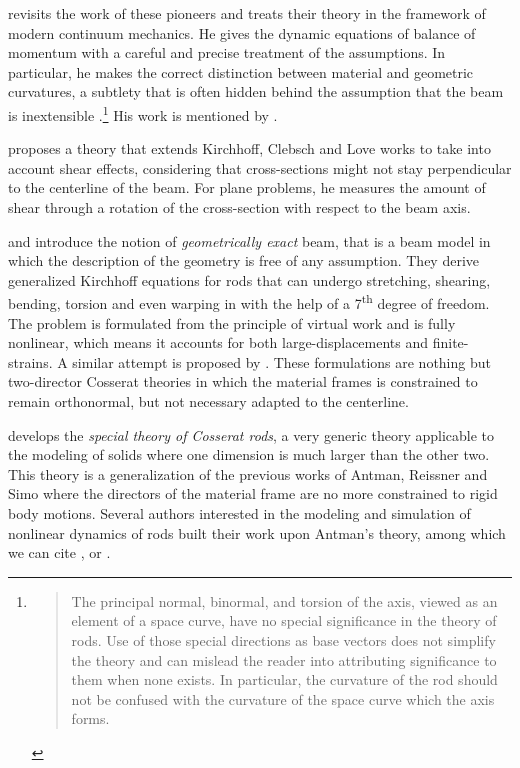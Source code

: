  revisits the work of these pioneers and treats their theory in the framework of modern continuum mechanics. He gives the dynamic equations of balance of momentum with a careful and precise treatment of the assumptions. In particular, he makes the correct distinction between material and geometric curvatures, a subtlety that is often hidden behind the assumption that the beam is inextensible \cite{Adriaenssens1999,Douthe2007,DAmico2014}.\footnote{\blockcquote[p.~5]{Dill1992}{The principal normal, binormal, and torsion of the axis, viewed as an element of a space curve, have no special significance in the theory of rods. Use of those special directions as base vectors does not simplify the theory and can mislead the reader into attributing significance to them when none exists. In particular, the curvature of the rod should not be confused with the curvature of the space curve which the axis forms.}} His work is mentioned by .


 proposes a theory that extends Kirchhoff, Clebsch and Love works to take into account shear effects, considering that cross-sections might not stay perpendicular to the centerline of the beam. For plane problems, he measures the amount of shear through a rotation of the cross-section with respect to the beam axis.

 and  introduce the notion of \emph{geometrically exact} beam, that is a beam model in which the description of the geometry is free of any assumption. They derive generalized Kirchhoff equations for rods that can undergo stretching, shearing, bending, torsion and even warping in \cite{Simo1991} with the help of a 7\textsuperscript{th} degree of freedom. The problem is formulated from the principle of virtual work and is fully nonlinear, which means it accounts for both large-displacements and finite-strains. A similar attempt is proposed by . These formulations are nothing but two-director Cosserat theories in which the material frames is constrained to remain orthonormal, but not necessary adapted to the centerline.

 develops the \emph{special theory of Cosserat rods}, a very generic theory applicable to the modeling of solids where one dimension is much larger than the other two. This theory is a generalization of the previous works of Antman, Reissner and Simo where the directors of the material frame are no more constrained to rigid body motions. Several authors interested in the modeling and simulation of nonlinear dynamics of rods built their work upon Antman's theory, among which we can cite ,  or .

